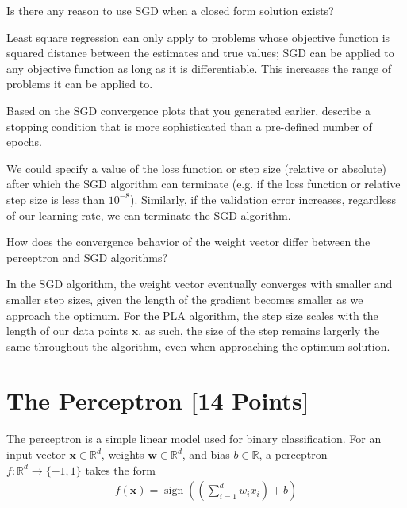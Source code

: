 \begin{problem}[2]
  Is there any reason to use SGD when a closed form solution exists?
\end{problem}
\begin{solution}
  Least square regression can only apply to problems whose objective function is squared distance between the estimates and true values; SGD can be applied to any objective function as long as it is differentiable. This increases the range of problems it can be applied to.
\end{solution}

\begin{problem}[2]
  Based on the SGD convergence plots that you generated earlier, describe a stopping condition that is more sophisticated than a pre-defined number of epochs.
\end{problem}
\begin{solution}
  We could specify a value of the loss function or step size (relative or absolute) after which the SGD algorithm can terminate (e.g. if the loss function or relative step size is less than $10^{-8}$). Similarly, if the validation error increases, regardless of our learning rate, we can terminate the SGD algorithm.
\end{solution}

\begin{problem}[2]
How does the convergence behavior of the weight vector differ between the perceptron and SGD algorithms?
\end{problem}
\begin{solution}
  In the SGD algorithm, the weight vector eventually converges with smaller and smaller step sizes, given the length of the gradient becomes smaller as we approach the optimum. For the PLA algorithm, the step size scales with the length of our data points $\mathbf{x}$, as such, the size of the step remains largerly the same throughout the algorithm, even when approaching the optimum solution.
\end{solution}





\newpage
\section{The Perceptron [14 Points]}

The perceptron is a simple linear model used for binary classification. For an input vector $\mathbf{x} \in \mathbb{R}^d$, weights $\mathbf{w} \in \mathbb{R}^d$, and bias $b \in \mathbb{R}$, a perceptron $f: \mathbb{R}^d \rightarrow \{-1,1\}$ takes the form
\begin{align*}
  f(\mathbf{x}) = \operatorname{sign}\left(\left(\sum_{i=1}^d w_i x_i\right) + b \right)
\end{align*}

